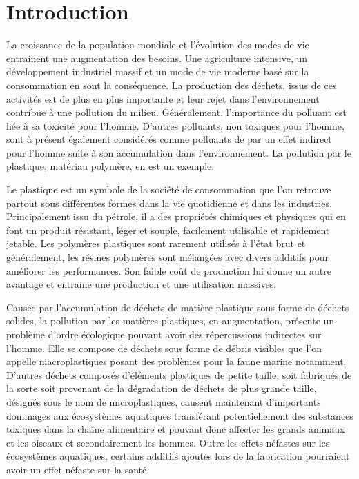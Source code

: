 \part{Introduction}
\setcounter{section}{0}

\par{
La croissance de la population mondiale et l'\'evolution des modes de vie entrainent une augmentation des besoins. Une agriculture intensive, un d\'eveloppement industriel massif et un mode de vie moderne bas\'e sur la consommation en sont la cons\'equence. La production des d\'echets, issus de ces activit\'es est de plus en plus importante et leur rejet dans l'environnement contribue \`a une pollution du milieu. G\'en\'eralement, l'importance du polluant est li\'ee \`a sa toxicit\'e pour l'homme. D'autres polluants, non toxiques pour l'homme, sont \`a pr\'esent \'egalement consid\'er\'es comme polluants de par un effet indirect pour l'homme suite \`a son accumulation dans l'environnement. La pollution par le plastique, mat\'eriau polym\`ere, en est un exemple.
}\\
\par{
Le plastique est un symbole de la soci\'et\'e de consommation que l'on retrouve partout sous diff\'erentes formes dans la vie quotidienne et dans les industries. Principalement issu du p\'etrole, il a des propri\'et\'es chimiques et physiques qui en font un produit r\'esistant, l\'eger et souple,  facilement utilisable et rapidement jetable. Les polym\`eres plastiques sont rarement utilis\'es \`a l'\'etat brut  et g\'en\'eralement, les r\'esines polym\`eres sont m\'elang\'ees avec divers additifs pour am\'eliorer les performances. Son faible co\^ut de production lui donne un autre avantage et entraine une production et une utilisation massives.
}\\
\par{
Caus\'ee par l'accumulation de d\'echets de mati\`ere plastique sous forme de d\'echets solides, la pollution par les mati\`eres plastiques, en augmentation, pr\'esente un probl\`eme d'ordre \'ecologique pouvant avoir des r\'epercussions indirectes sur l'homme. Elle se compose de d\'echets sous forme de d\'ebris visibles que l'on appelle macroplastiques posant des probl\`emes pour la faune marine notamment. D'autres d\'echets compos\'es d'\'el\'ements plastiques de petite taille, soit fabriqu\'es de la sorte soit provenant de la d\'egradation de d\'echets de plus grande taille, d\'esign\'es sous le nom de microplastiques, causent maintenant d'importants dommages aux \'ecosyst\`emes aquatiques transf\'erant potentiellement des substances toxiques dans la cha\^ine alimentaire et pouvant donc affecter les grands animaux et les oiseaux et secondairement les hommes. Outre les effets n\'efastes sur les \'ecosyst\`emes aquatiques, certains additifs ajout\'es lors de la fabrication pourraient avoir un effet n\'efaste sur la sant\'e. 
}\\
